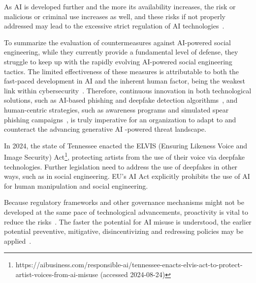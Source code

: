 As AI is developed further and the more its availability increases, the risk or malicious or criminal use increases as well, and these risks if not properly addressed may lead to the excessive strict regulation of AI technologies~\citep{king_AI_Crime_Interdisciplinary_Analysis_2019}.

To summarize the evaluation of countermeasures against AI-powered social engineering, while they currently provide a fundamental level of defense, they struggle to keep up with the rapidly evolving AI-powered social engineering tactics. The limited effectiveness of these measures is attributable to both the fast-paced development in AI and the inherent human factor, being the weakest link within cybersecurity~\citep{mitnick_The_Art_of_Deception_2003}. Therefore, continuous innovation in both technological solutions, such as AI-based phishing and deepfake detection algorithms~\citep{mirsky_Creation_Detection_Deepfakes_2021}, and human-centric strategies, such as awareness programs and simulated spear phishing campaigns~\citep{hadnagy_Social_Engineering_The_Science_2018}, is truly imperative for an organization to adapt to and counteract the advancing generative AI -powered threat landscape.

In 2024, the state of Tennessee enacted the ELVIS (Ensuring Likeness Voice and Image Security) Act\footnote{https://aibusiness.com/responsible-ai/tennessee-enacts-elvis-act-to-protect-artist-voices-from-ai-misuse (accessed 2024-08-24)}, protecting artists from the use of their voice via deepfake technologies. Further legislation need to address the use of deepfakes in other ways, such as in social engineering. EU's AI Act explicitly prohibits the use of AI for human  manipulation and social engineering.

Because regulatory frameworks and other governance mechanisms might not be developed at the same pace of technological advancements, proactivity is vital to reduce the risks~\citep{blauth_AI_Crime_Overview_Malicious_Use_Abuse_2022}. The faster the potential for AI misuse is understood, the earlier potential preventive, mitigative, disincentivizing and redressing policies may be applied~\citep{king_AI_Crime_Interdisciplinary_Analysis_2019}.